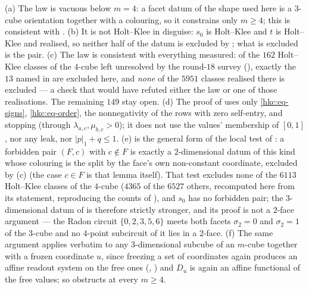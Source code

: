 \begin{remark}\label{hkc:remark}
(a) The law is vacuous below $m=4$: a facet datum of the shape used here is a
$3$-cube orientation together with a colouring, so it constrains only
$m\ge4$; this is consistent with .
(b) It is not Holt--Klee in disguise: $s_0$ is Holt--Klee and $t$ is
Holt--Klee and realised, so neither half of the datum is excluded by
; what is excluded is the pair.
(c) The law is consistent with everything measured: of the $162$ Holt--Klee
classes of the $4$-cube left unresolved by the round-$18$ survey
(), exactly the $13$ named in  are excluded
here, and \emph{none} of the $5951$ classes realised there is excluded --- a
check that would have refuted either the law or one of those realisations.
The remaining $149$ stay open.
(d) The proof of  uses only \eqref{hkc:eq-signs},
\eqref{hkc:eq-order}, the nonnegativity of the rows with zero self-entry, and
stopping (through $\lambda_{a,c},\mu_{b,c}>0$); it does not use the values'
membership of $[0,1]$, nor any leak, nor $|p|_1+q\le1$.
(e)  is the general form of the local test of
: a forbidden pair $(F,c)$ with $c\notin F$ is exactly a
$2$-dimensional datum of this kind whose colouring is the split by the face's
own non-constant coordinate, excluded by (c) (the case
$c\in F$ is that lemma itself). That test excludes none of the $6113$
Holt--Klee classes of the $4$-cube ($4365$ of the $6527$ others, recomputed
here from its statement, reproducing the counts of ), and
$s_0$ has no forbidden pair; the $3$-dimensional datum of
 is therefore strictly stronger, and its proof is not a
$2$-face argument --- the Radon circuit $\{0,2,3,5,6\}$ meets both facets
$\sigma_2=0$ and $\sigma_2=1$ of the $3$-cube and no $4$-point subcircuit of
it lies in a $2$-face.
(f) The same argument applies verbatim to any $3$-dimensional subcube of an
$m$-cube together with a frozen coordinate $u$, since freezing a set of
coordinates again produces an affine readout system on the free ones
(, ) and $D_u$ is again an affine
functional of the free values; so  obstructs at every
$m\ge4$.
\end{remark}
